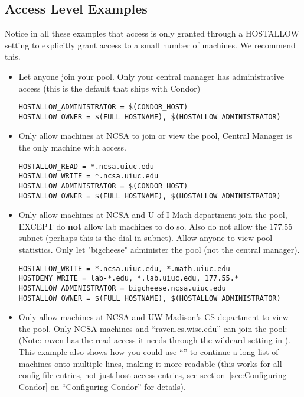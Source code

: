 \subsection{Access Level Examples}
\label{sec:DCPerm-Examples}

Notice in all these examples that  access is
only granted through a HOSTALLOW setting to explicitly grant access to
a small number of machines.  We recommend this.

\begin{itemize}

\item Let anyone join your pool.  Only your central manager has
administrative access (this is the default that ships with Condor)

\begin{verbatim}
HOSTALLOW_ADMINISTRATOR = $(CONDOR_HOST)
HOSTALLOW_OWNER = $(FULL_HOSTNAME), $(HOSTALLOW_ADMINISTRATOR)
\end{verbatim}


\item Only allow machines at NCSA to join or view the pool, Central
Manager is the only machine with  access.

\begin{verbatim}
HOSTALLOW_READ = *.ncsa.uiuc.edu
HOSTALLOW_WRITE = *.ncsa.uiuc.edu
HOSTALLOW_ADMINISTRATOR = $(CONDOR_HOST)
HOSTALLOW_OWNER = $(FULL_HOSTNAME), $(HOSTALLOW_ADMINISTRATOR)
\end{verbatim}


\item Only allow machines at NCSA and U of I Math department join the
pool, EXCEPT do \textbf{not} allow lab machines to do so.  Also do not
allow the 177.55 subnet (perhaps this is the dial-in subnet).  Allow
anyone to view pool statistics.  Only let "bigcheese" administer the
pool (not the central manager).

\begin{verbatim}
HOSTALLOW_WRITE = *.ncsa.uiuc.edu, *.math.uiuc.edu
HOSTDENY_WRITE = lab-*.edu, *.lab.uiuc.edu, 177.55.*
HOSTALLOW_ADMINISTRATOR = bigcheese.ncsa.uiuc.edu
HOSTALLOW_OWNER = $(FULL_HOSTNAME), $(HOSTALLOW_ADMINISTRATOR)
\end{verbatim}

\item Only allow machines at NCSA and UW-Madison's CS department to
view the pool.  Only NCSA machines and ``raven.cs.wisc.edu'' can join
the pool: (Note: raven has the read access it needs through the
wildcard setting in ).  This example also shows
how you could use ``\verb@\@'' to continue a long list of machines
onto multiple lines, making it more readable (this works for all
config file entries, not just host access entries, see
section~\ref{sec:Configuring-Condor} on ``Configuring Condor'' for
details).


\end{itemize}
